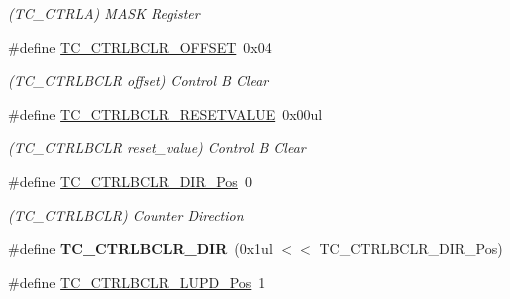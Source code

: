 \begin{DoxyCompactItemize}
\begin{DoxyCompactList}\small\item\em (T\+C\+\_\+\+C\+T\+R\+L\+A) M\+A\+S\+K Register \end{DoxyCompactList}\item 
\hypertarget{group___s_a_m_l21___t_c_ga6f43d353e78103cf7c4b5d047264e72b}{}\#define \hyperlink{group___s_a_m_l21___t_c_ga6f43d353e78103cf7c4b5d047264e72b}{T\+C\+\_\+\+C\+T\+R\+L\+B\+C\+L\+R\+\_\+\+O\+F\+F\+S\+E\+T}~0x04\label{group___s_a_m_l21___t_c_ga6f43d353e78103cf7c4b5d047264e72b}

\begin{DoxyCompactList}\small\item\em (T\+C\+\_\+\+C\+T\+R\+L\+B\+C\+L\+R offset) Control B Clear \end{DoxyCompactList}\item 
\hypertarget{group___s_a_m_l21___t_c_ga03ae355405f8eafa3dd94622325cf985}{}\#define \hyperlink{group___s_a_m_l21___t_c_ga03ae355405f8eafa3dd94622325cf985}{T\+C\+\_\+\+C\+T\+R\+L\+B\+C\+L\+R\+\_\+\+R\+E\+S\+E\+T\+V\+A\+L\+U\+E}~0x00ul\label{group___s_a_m_l21___t_c_ga03ae355405f8eafa3dd94622325cf985}

\begin{DoxyCompactList}\small\item\em (T\+C\+\_\+\+C\+T\+R\+L\+B\+C\+L\+R reset\+\_\+value) Control B Clear \end{DoxyCompactList}\item 
\hypertarget{group___s_a_m_l21___t_c_gae58ad3f83e42cd17722142b523b9c037}{}\#define \hyperlink{group___s_a_m_l21___t_c_gae58ad3f83e42cd17722142b523b9c037}{T\+C\+\_\+\+C\+T\+R\+L\+B\+C\+L\+R\+\_\+\+D\+I\+R\+\_\+\+Pos}~0\label{group___s_a_m_l21___t_c_gae58ad3f83e42cd17722142b523b9c037}

\begin{DoxyCompactList}\small\item\em (T\+C\+\_\+\+C\+T\+R\+L\+B\+C\+L\+R) Counter Direction \end{DoxyCompactList}\item 
\hypertarget{group___s_a_m_l21___t_c_ga80a58f42eacfbe1008a2f6d2e474063d}{}\#define {\bfseries T\+C\+\_\+\+C\+T\+R\+L\+B\+C\+L\+R\+\_\+\+D\+I\+R}~(0x1ul $<$$<$ T\+C\+\_\+\+C\+T\+R\+L\+B\+C\+L\+R\+\_\+\+D\+I\+R\+\_\+\+Pos)\label{group___s_a_m_l21___t_c_ga80a58f42eacfbe1008a2f6d2e474063d}

\item 
\hypertarget{group___s_a_m_l21___t_c_gabfa71a9b8b1916e470d5c882c1614d8a}{}\#define \hyperlink{group___s_a_m_l21___t_c_gabfa71a9b8b1916e470d5c882c1614d8a}{T\+C\+\_\+\+C\+T\+R\+L\+B\+C\+L\+R\+\_\+\+L\+U\+P\+D\+\_\+\+Pos}~1\label{group___s_a_m_l21___t_c_gabfa71a9b8b1916e470d5c882c1614d8a}


\end{DoxyCompactItemize}

